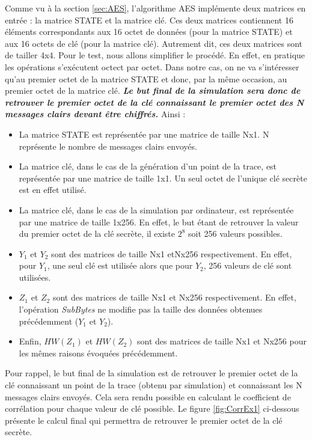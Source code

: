 \documentclass[10pt, oneside, a4paper]{article}
\begin{document}
\vspace{-0.3 cm}Comme vu à la section \ref{sec:AES}, l'algorithme AES implémente deux matrices en entrée : la matrice STATE et la matrice clé. Ces deux matrices contiennent 16 éléments correspondants aux 16 octet de données (pour la matrice STATE) et aux 16 octets de clé (pour la matrice clé). Autrement dit, ces deux matrices sont de tailler 4x4. Pour le test, nous allons simplifier le procédé. En effet, en pratique les opérations s'exécutent octect par octet. Dans notre cas, on ne va s'intéresser qu'au premier octet de la matrice STATE et donc, par la même occasion, au premier octet de la matrice clé. \textbf{\textit{Le but final de la simulation sera donc de retrouver le premier octet de la clé connaissant le premier octet des N messages clairs devant être chiffrés.}}
Ainsi :
\begin{itemize}
\item La matrice STATE est représentée par une matrice de taille Nx1. N représente le nombre de messages clairs envoyés.
\item La matrice clé, dans le cas de la génération d'un point de la trace, est représentée par une matrice de taille 1x1. Un seul octet de l'unique clé secrète est en effet utilisé.
\item La matrice clé, dans le cas de la simulation par ordinateur, est représentée par une matrice de taille 1x256. En effet, le but étant de retrouver la valeur du premier octet de la clé secrète, il existe $2^8$ soit 256 valeurs possibles.
\item $Y_1$ et $Y_2$ sont des matrices de taille Nx1 etNx256 respectivement. En effet, pour $Y_1$, une seul clé est utilisée alors que pour $Y_2$, 256 valeurs de clé sont utilisées.
\item $Z_1$ et $Z_2$ sont des matrices de taille Nx1 et Nx256 respectivement. En effet, l'opération \textit{SubBytes} ne modifie pas la taille des données obtenues précédemment ($Y_1$ et $Y_2$).
\item Enfin, $HW(Z_1)$ et $HW(Z_2)$ sont des matrices de taille Nx1 et Nx256 pour les mêmes raisons évoquées précédemment. \\
\end{itemize}

\vspace{-0.2 cm}Pour rappel, le but final de la simulation est de retrouver le premier octet de la clé connaissant un point de la trace (obtenu par simulation) et connaissant les N messages clairs envoyés. Cela sera rendu possible en calculant le coefficient de corrélation pour chaque valeur de clé possible. Le figure \ref{fig:CorrEx1} ci-dessous présente le calcul final qui permettra de retrouver le premier octet de la clé secrète.
\end{document}
